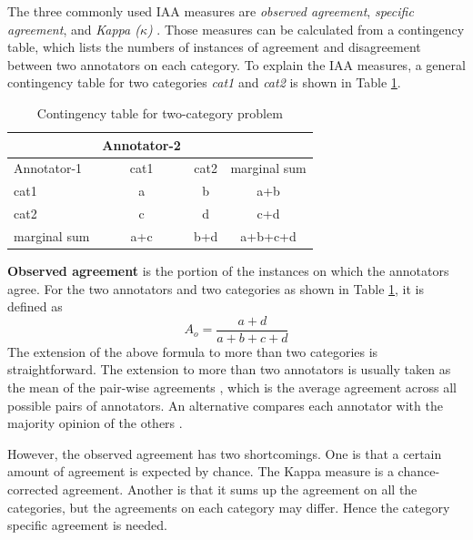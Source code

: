 
The three commonly used IAA measures are {\em observed agreement}, {\em specific agreement}, 
and {\em Kappa ($\kappa$)} \cite{Hripcsak02}. Those measures can be 
calculated from a contingency table, which lists the numbers of instances of 
agreement and disagreement between two annotators on each category. To explain the 
IAA measures, a general contingency table for two categories {\em cat1} and {\em cat2}
 is shown in Table \ref{table:iaa-kappa:contingency}.

\begin{table}[hbt]
{\centering
\begin{tabular}{|l|cc|c|} 
\hline
   & Annotator-2 & & \\
\hline
Annotator-1  & cat1 & cat2 & marginal sum\\
\hline
 cat1& a & b & a+b\\ 
cat2 & c & d & c+d\\
\hline
marginal sum & a+c & b+d &a+b+c+d\\
 \hline
\end{tabular}\par}
\caption{Contingency table for two-category problem}
\label{table:iaa-kappa:contingency}
\end{table}


{\bf Observed agreement} is the portion of the instances on which the 
annotators agree. For the two annotators and two categories as shown in
 Table \ref{table:iaa-kappa:contingency}, it is defined as
\begin{equation}
A_{o} = \frac{a+d}{a+b+c+d}
\end{equation}
The extension of the above formula to more than two categories is 
straightforward. The extension to more than two annotators is usually taken 
as the mean of the pair-wise agreements \cite{Fleiss75}, which is the average agreement 
across all possible pairs of annotators. 
An alternative compares each annotator with the majority opinion of the others 
\cite{Fleiss75}.

However, the observed agreement has two shortcomings. One is that a certain 
amount of agreement is expected by chance. The Kappa measure is a chance-corrected 
agreement. Another is that it sums up the agreement on all the categories, but 
the agreements on each category may differ. Hence the category specific agreement 
is needed.

